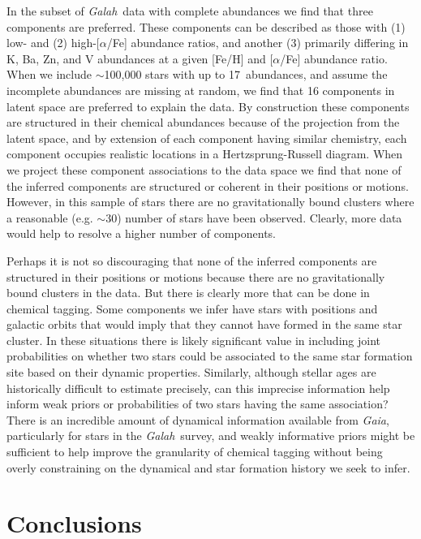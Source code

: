 \documentclass[twocolumn]{aastex62}
\newcommand{\project}[1]{\textsl{#1}}
\newcommand{\Galah}{\project{Galah}}
\newcommand{\ExpThreeNumAbundances}{17}
\begin{document}
In the subset of \Galah\ data with complete abundances we find that three components are
preferred. These components can be described as those with (1) low- and (2) high-[$\alpha$/Fe] abundance ratios, and another (3) primarily differing in K, Ba, Zn, and V abundances at a given [Fe/H] and [$\alpha$/Fe] abundance ratio. When we include $\sim$100,000 stars with up to \ExpThreeNumAbundances\ abundances, and assume the incomplete abundances are missing at random, we find that 16 components in latent space are preferred to explain the data. By construction these  components
are structured in their chemical abundances because of the projection from the latent
space, and by extension of each component having similar chemistry, each component
occupies realistic locations in a Hertzsprung-Russell diagram. When we
project these component associations to the data space we find that none of the inferred
components are structured or coherent in their positions or motions. However, in this sample of stars there are no gravitationally bound clusters where a reasonable (e.g. $\sim$30) number of stars have been observed. Clearly, more data would help to resolve a higher number of components.

Perhaps it is not so discouraging that none of the inferred components are structured in their positions or motions because there are no gravitationally bound clusters in the data. But there is clearly more that can be done in chemical tagging. Some components we infer have stars with positions and galactic orbits that would imply that they cannot have formed in the same star cluster. In these situations there is likely significant value in including joint probabilities on whether two stars could be associated to the same star formation site based on their dynamic properties. Similarly, although stellar ages are historically difficult to estimate precisely, can this imprecise information help inform weak priors or probabilities of two stars having the same association? There is an incredible amount of dynamical information available from \project{Gaia}, particularly for stars in the \Galah\ survey, and weakly informative priors might be sufficient to help improve the granularity of chemical tagging without being overly constraining on the dynamical and star formation history we seek to infer.



\section{Conclusions} \label{sec:conclusions}
\end{document}

